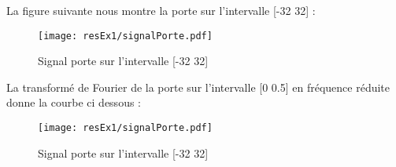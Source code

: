 La figure suivante nous montre la porte sur l'intervalle [-32 32] : 
\begin{figure}[H]
\centering
\texttt{[image: resEx1/signalPorte.pdf]}
\caption{Signal porte sur l'intervalle [-32 32]}
\end{figure}

La transformé de Fourier de la porte sur l'intervalle [0 0.5] en fréquence réduite donne la courbe ci dessous : 
\begin{figure}[H]
\centering
\texttt{[image: resEx1/signalPorte.pdf]}
\caption{Signal porte sur l'intervalle [-32 32]}
\end{figure}


